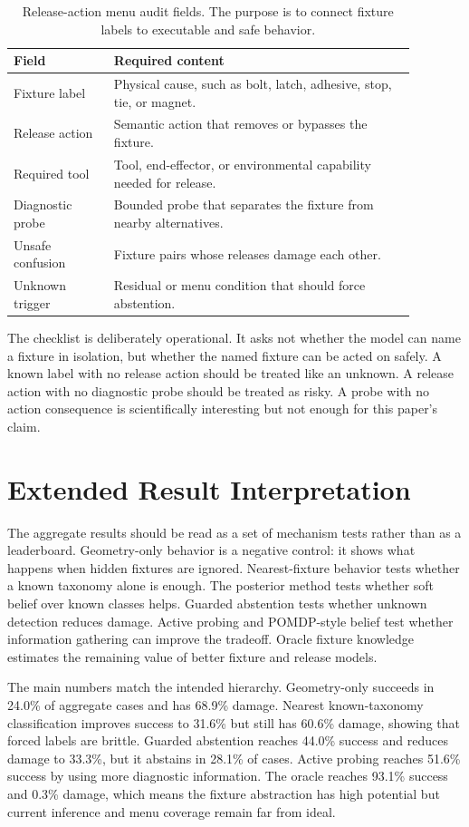 \documentclass{article}
\begin{document}
\begin{table}[h]
\centering
\caption{Release-action menu audit fields. The purpose is to connect fixture
labels to executable and safe behavior.}
\begin{tabular}{p{0.22\linewidth}p{0.66\linewidth}}
\toprule
Field & Required content \\
\midrule
Fixture label & Physical cause, such as bolt, latch, adhesive, stop, tie, or magnet. \\
Release action & Semantic action that removes or bypasses the fixture. \\
Required tool & Tool, end-effector, or environmental capability needed for release. \\
Diagnostic probe & Bounded probe that separates the fixture from nearby alternatives. \\
Unsafe confusion & Fixture pairs whose releases damage each other. \\
Unknown trigger & Residual or menu condition that should force abstention. \\
\bottomrule
\end{tabular}
\end{table}

The checklist is deliberately operational. It asks not whether the model can
name a fixture in isolation, but whether the named fixture can be acted on
safely. A known label with no release action should be treated like an
unknown. A release action with no diagnostic probe should be treated as risky.
A probe with no action consequence is scientifically interesting but not
enough for this paper's claim.

\section{Extended Result Interpretation}

The aggregate results should be read as a set of mechanism tests rather than
as a leaderboard. Geometry-only behavior is a negative control: it shows what
happens when hidden fixtures are ignored. Nearest-fixture behavior tests
whether a known taxonomy alone is enough. The posterior method tests whether
soft belief over known classes helps. Guarded abstention tests whether
unknown detection reduces damage. Active probing and POMDP-style belief test
whether information gathering can improve the tradeoff. Oracle fixture
knowledge estimates the remaining value of better fixture and release models.

The main numbers match the intended hierarchy. Geometry-only succeeds in
24.0\% of aggregate cases and has 68.9\% damage. Nearest known-taxonomy
classification improves success to 31.6\% but still has 60.6\% damage,
showing that forced labels are brittle. Guarded abstention reaches 44.0\%
success and reduces damage to 33.3\%, but it abstains in 28.1\% of cases.
Active probing reaches 51.6\% success by using more diagnostic information.
The oracle reaches 93.1\% success and 0.3\% damage, which means the fixture
abstraction has high potential but current inference and menu coverage remain
far from ideal.
\end{document}
